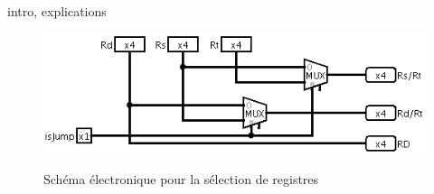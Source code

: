 \paragraph{}{
	intro, explications
}

\begin{figure}
	\includegraphics[scale=0.8]{circuits/selec_reg.png}
	\label{selec_reg_circ}
	\caption{Sch\'{e}ma \'{e}lectronique pour la s\'{e}lection de registres}
\end{figure}